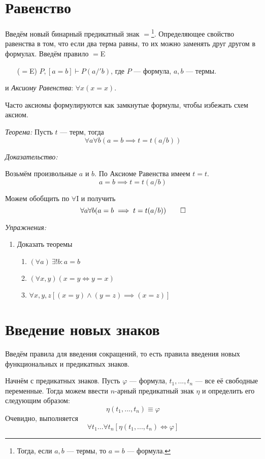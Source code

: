 \section{Равенство}

Введём новый бинарный предикатный знак $=$\footnote{
	Тогда, если $a,b$	 --- термы, то $a=b$ --- формула.
}.
Определяющее свойство равенства в том, что если два терма равны, то их можно
заменять друг другом в формулах. Введём правило $=$E
\begin{enumerate}
	\item[($=$E)]{}$P,[a=b]\vdash P(a/'b)$,
	где $P$ --- формула, $a,b$ --- термы.
\end{enumerate}
и {\it Аксиому Равенства}: $\forall x(x=x)$.

Часто аксиомы формулируются как замкнутые формулы, чтобы избежать схем аксиом.

\vspace{1em}
{\it Теорема:} Пусть $t$ --- терм, тогда
\[
	\forall a\forall b(a=b\implies t=t(a/b))
\]

{\it Доказательство:}

Возьмём произвольные $a$ и $b$. По Аксиоме Равенства имеем $t=t$.
\[
	a=b\implies t=t(a/b)
\]

Можем обобщить по $\forall$I и получить
\[
	\forall a\forall b(a=b\implies t=t(a/b))
	\qed
\]

\vspace{1em}
{\it Упражнения:}
\begin{enumerate}
	\item{}Доказать теоремы
	\begin{enumerate}
		\item{}$(\forall a)~\exists! b:a=b$
		\item{}$(\forall x,y)(x=y\iff y=x)$
		\item{}$\forall x,y,z[(x=y)\land (y=z)\implies (x=z)]$
	\end{enumerate}
\end{enumerate}

\section{Введение новых знаков}

Введём правила для введения сокращений, то есть правила введения новых функциональных
и предикатных знаков.

Начнём с предикатных знаков. Пусть $\varphi$ --- формула, $t_1,...,t_{n}$ --- все её
свободные переменные. Тогда можем ввести $n$-арный предикатный знак $\eta$
и определить его следующим образом:
\[
	\eta(t_1,...,t_{n})\equiv \varphi
\]
Очевидно, выполняется
\[
	\forall t_1...\forall t_{n}[\eta(t_1,...,t_{n})\iff\varphi]
\]

